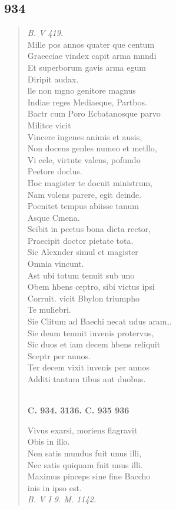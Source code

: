 \documentclass[11pt, a4paper]{report}
\begin{document}
            \subsection*{934}
      \begin{verse}
      \textit{B. V 419.} \\ Mille pos annos quater que centum \\ Graeeciae vindex capit arma mnndi \\ Et superborum gavis arma egum \\ Diripit audax. \\ lle non mgno genitore magnus \\ Indiae reges Mediaeque, Partbos. \\ Bactr cum Poro Ecbatanosque parvo \\ Militce vicit \\ Vincere ingenes animis et ausis, \\ Non docens genles numeo et metllo, \\ Vi cele, virtute valens, pofundo \\ Peetore doclus. \\ Hoc magister te docuit ministrum, \\ Nam volens parere, egit deinde. \\ Poenitet tempus abiisse tanum \\ Asque Cmena. \\ Scibit in pectus bona dicta rector, \\ Praecipit doctor pietate tota. \\ Sic Alexnder simul et magister \\ Omnia vincunt. \\ Ast ubi totum tenuit sub uno \\ Obem hbens ceptro, sibi victus ipsi \\ Corruit. vicit Bbylon triumpho \\ Te muliebri. \\ Sie Clitum ad Baechi necat  \lbrack udus \rbrack  aram,. \\ Sie deum temnit iuvenis protervus, \\ Sic duos et iam decem hbens reliquit \\ Sceptr per annos. \\ Ter decem vixit iuvenis per annos \\ Additi tantum tibus aut duobus. \\ 
        ﻿\pagebreak 
    \begin{center} \textbf{C. 934. 3136. C. 935 936} \end{center} \marginpar{[359]} Vivus exarsi, moriens flagravit \\ Obis in illo. \\ Non satis mundus fuit unus illi, \\ Nec satis quiquam fuit unus illi. \\ Maximus pinceps sine fine Baccho \\ inis in ipso est. \\ \textit{B. V I 9. M. 1142.} \\ 
      \end{verse}
  
\end{document}
